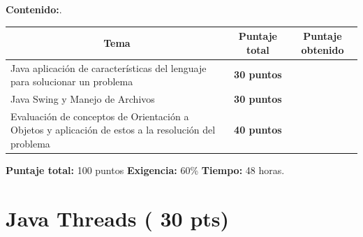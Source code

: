 \documentclass{exam}
\begin{document}
\vspace{5mm}
\noindent
\textbf{Contenido:}.

\vspace{2mm}
\noindent
\begin{table}[H]
{\normalsize
\begin{tabular}{|p{9.5cm}|p{3.3cm}|p{3.3cm}|}
\hline
    \multicolumn{1}{|c}{\textbf{Tema}} &
    \multicolumn{1}{|c}{\textbf{Puntaje total}} &
    \multicolumn{1}{|c|}{\textbf{Puntaje obtenido}} \\
\hline
    Java aplicaci\'on de caracter\'isticas del lenguaje para solucionar un problema  &
    \multicolumn{1}{|c|}{\textbf{30 puntos}} & \\
\hline
    Java Swing y Manejo de Archivos &
    \multicolumn{1}{|c|}{\textbf{30 puntos}} & \\
\hline
    Evaluaci\'on de conceptos de Orientaci\'on a Objetos y aplicaci\'on de estos a la resoluci\'on del problema&
    \multicolumn{1}{|c|}{\textbf{40 puntos}} & \\
\hline
\end{tabular}}
\end{table}

\vspace{-2mm}
\noindent
\textbf{Puntaje total:} 100 puntos \textbf{Exigencia:} 60\% \textbf{Tiempo:} 48 horas.

\newpage
\noindent
\section{\textbf{Java Threads ( 30 pts)}}
\noindent
\end{document}
